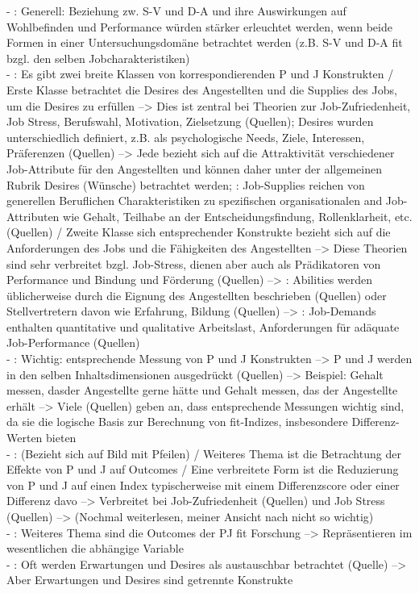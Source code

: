 - \cite[S. 5]{edwards:1990}: Generell: Beziehung zw. S-V und D-A und ihre Auswirkungen auf Wohlbefinden und Performance würden stärker erleuchtet werden, wenn beide Formen in einer Untersuchungsdomäne betrachtet werden (z.B. S-V und D-A fit bzgl. den selben Jobcharakteristiken) \textcite{caplan:1987} \\
- \cite[S. 2f.]{edwards:1991}: Es gibt zwei breite Klassen von korrespondierenden P und J Konstrukten / Erste Klasse betrachtet die Desires des Angestellten und die Supplies des Jobs, um die Desires zu erfüllen --> Dies ist zentral bei Theorien zur Job-Zufriedenheit, Job Stress, Berufswahl, Motivation, Zielsetzung (Quellen); Desires wurden unterschiedlich definiert, z.B. als psychologische Needs, Ziele, Interessen, Präferenzen (Quellen) --> Jede bezieht sich auf die Attraktivität verschiedener Job-Attribute für den Angestellten und können daher unter der allgemeinen Rubrik Desires (Wünsche) betrachtet werden; \cite[S. 3]{edwards:1991}: Job-Supplies reichen von generellen Beruflichen Charakteristiken zu spezifischen organisationalen and Job-Attributen wie Gehalt, Teilhabe an der Entscheidungsfindung, Rollenklarheit, etc. (Quellen) / Zweite Klasse sich entsprechender Konstrukte bezieht sich auf die Anforderungen des Jobs und die Fähigkeiten des Angestellten --> Diese Theorien sind sehr verbreitet bzgl. Job-Stress, dienen aber auch als Prädikatoren von Performance und Bindung und Förderung (Quellen) --> \cite[S. 3f.]{edwards:1991}: Abilities werden üblicherweise durch die Eignung des Angestellten beschrieben (Quellen) oder Stellvertretern davon wie Erfahrung, Bildung (Quellen) --> \cite[S. 4]{edwards:1991}: Job-Demands enthalten quantitative und qualitative Arbeitslast, Anforderungen für adäquate Job-Performance (Quellen) \\
- \cite[S. 4]{edwards:1991}: Wichtig: entsprechende Messung von P und J Konstrukten --> P und J werden in den selben Inhaltsdimensionen ausgedrückt (Quellen) --> Beispiel: Gehalt messen, dasder Angestellte gerne hätte und Gehalt messen, das der Angestellte erhält --> Viele (Quellen) geben an, dass entsprechende Messungen wichtig sind, da sie die logische Basis zur Berechnung von fit-Indizes, insbesondere Differenz-Werten bieten \\
- \cite[S. 4]{edwards:1991}: (Bezieht sich auf Bild mit Pfeilen) / Weiteres Thema ist die Betrachtung der Effekte von P und J auf Outcomes / Eine verbreitete Form ist die Reduzierung von P und J auf einen Index typischerweise mit einem Differenzscore oder einer Differenz davo --> Verbreitet bei Job-Zufriedenheit (Quellen) und Job Stress (Quellen) --> (Nochmal weiterlesen, meiner Ansicht nach nicht so wichtig) \\
- \cite[S. 5]{edwards:1991}: Weiteres Thema sind die Outcomes der PJ fit Forschung --> Repräsentieren im wesentlichen die abhängige Variable \\
- \cite[S. 7]{edwards:1991}: Oft werden Erwartungen und Desires als austauschbar betrachtet (Quelle) --> Aber Erwartungen und Desires sind getrennte Konstrukte \\

